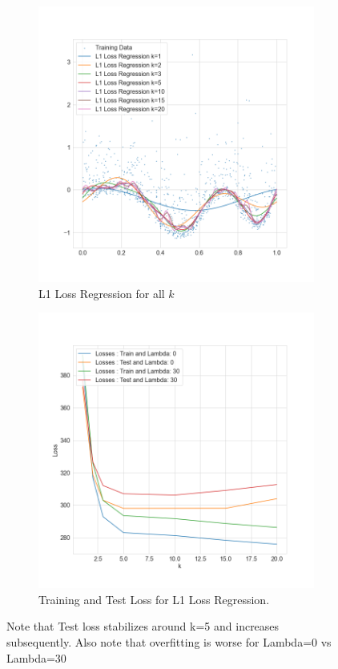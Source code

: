 \documentclass{./tufte-handout}
\begin{document}
\begin{enumerate}[(a)]
\begin{enumerate}
   \begin{figure}
    \centering
    \begin{subfigure}[b]{.5\textwidth}
        \includegraphics{../figures/l1_regression_all_k.png}
        \caption{L1 Loss Regression for all $k$}
    \end{subfigure}%
    \begin{subfigure}[b]{.5\textwidth}
        \includegraphics{../figures/l1_losses_for_k.png}
        \caption{Training and Test Loss for L1 Loss Regression.
        }
    \end{subfigure}
    \caption{Note that Test loss stabilizes around k=5 
    and increases subsequently. Also note that overfitting is 
    worse for Lambda=0 vs Lambda=30}
   \end{figure}
    \FloatBarrier


\end{enumerate}
\end{enumerate}
\end{document}
